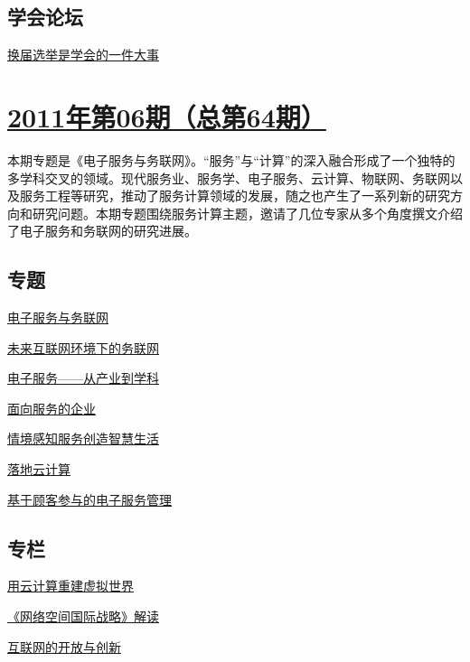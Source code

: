 \documentclass[a4paper]{article}
\begin{document}
\subsection{学会论坛}
\href{http://history.ccf.org.cn/resources/1190201776262/2011/07/14/15.pdf}{换届选举是学会的一件大事}


\section{\href{http://history.ccf.org.cn/sites/ccf/jsjtbbd.jsp?contentId=2615820732256}{\textbf{2011年第06期（总第64期）}}}
本期专题是《电子服务与务联网》。“服务”与“计算”的深入融合形成了一个独特的多学科交叉的领域。现代服务业、服务学、电子服务、云计算、物联网、务联网以及服务工程等研究，推动了服务计算领域的发展，随之也产生了一系列新的研究方向和研究问题。本期专题围绕服务计算主题，邀请了几位专家从多个角度撰文介绍了电子服务和务联网的研究进展。
\subsection{专题}
\href{http://history.ccf.org.cn/resources/1190201776262/2011/06/13/1.pdf}{电子服务与务联网}

\href{http://history.ccf.org.cn/resources/1190201776262/2011/06/13/2.pdf}{未来互联网环境下的务联网}

\href{http://history.ccf.org.cn/resources/1190201776262/2011/06/13/3.pdf}{电子服务——从产业到学科}

\href{http://history.ccf.org.cn/resources/1190201776262/2011/06/13/4.pdf}{面向服务的企业}

\href{http://history.ccf.org.cn/resources/1190201776262/2011/06/13/5.pdf}{情境感知服务创造智慧生活}

\href{http://history.ccf.org.cn/resources/1190201776262/2011/06/13/6.pdf}{落地云计算}

\href{http://history.ccf.org.cn/resources/1190201776262/2011/06/13/7.pdf}{基于顾客参与的电子服务管理}

\subsection{专栏}
\href{http://history.ccf.org.cn/resources/1190201776262/2011/06/13/9.pdf}{用云计算重建虚拟世界}

\href{http://history.ccf.org.cn/resources/1190201776262/2011/06/13/8.pdf}{《网络空间国际战略》解读}

\href{http://history.ccf.org.cn/resources/1190201776262/2011/06/13/10.pdf}{互联网的开放与创新}
\end{document}
